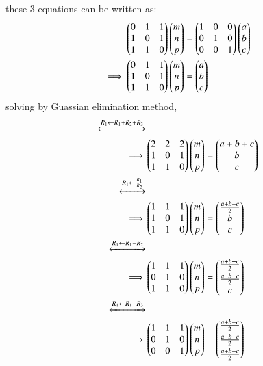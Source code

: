 \documentclass[journal,12pt,twocolumn]{IEEEtran}
\theoremstyle{remark}
\begin{document}
these 3 equations can be written as:
\begin{align}
    \begin{pmatrix}0&1&1\\1&0&1\\1&1&0\end{pmatrix}\begin{pmatrix}m\\n\\p\end{pmatrix} &= \begin{pmatrix}1&0&0\\0&1&0\\0&0&1\end{pmatrix}\begin{pmatrix}a\\b\\c\end{pmatrix}\\
    \implies\begin{pmatrix}0&1&1\\1&0&1\\1&1&0\end{pmatrix}\begin{pmatrix}m\\n\\p\end{pmatrix} &= \begin{pmatrix}a\\b\\c\end{pmatrix}
\end{align}
solving by Guassian elimination method,
\begin{align}
    \xleftrightarrow[]{R_1 \leftarrow R_1+R_2+R_3}&\\
    \implies&\myvec{2&2&2\\1&0&1\\1&1&0}\myvec{m\\n\\p} = \myvec{a+b+c\\b\\c}\\
    \xleftrightarrow[]{R_1 \leftarrow \frac{R_1}{R_2}}&\\
    \implies&\myvec{1&1&1\\1&0&1\\1&1&0}\myvec{m\\n\\p} = \myvec{\frac{a+b+c}{2}\\b\\c}\\
    \xleftrightarrow[]{R_1 \leftarrow R_1-R_2}&\\
    \implies&\myvec{1&1&1\\0&1&0\\1&1&0}\myvec{m\\n\\p} = \myvec{\frac{a+b+c}{2}\vspace{0.1cm}\\\frac{a-b+c}{2}\\c}\\
    \xleftrightarrow[]{R_1 \leftarrow R_1-R_3}&\\
    \implies&\myvec{1&1&1\\0&1&0\\0&0&1}\myvec{m\\n\\p} = \myvec{\frac{a+b+c}{2}\vspace{0.1cm}\\\frac{a-b+c}{2}\vspace{0.1cm}\\\frac{a+b-c}{2}}
\end{align}
\end{document}
